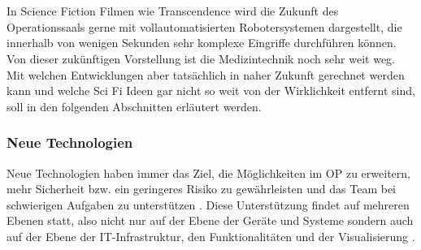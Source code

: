 \chapter{}
\label{sec:overview}

In Science Fiction Filmen wie Transcendence wird die Zukunft des Operationssaals gerne mit vollautomatisierten Robotersystemen dargestellt, die innerhalb von wenigen Sekunden sehr komplexe Eingriffe durchführen können. 
Von dieser zukünftigen Vorstellung ist die Medizintechnik noch sehr weit weg. Mit welchen Entwicklungen aber tatsächlich in naher Zukunft gerechnet werden kann und welche Sci Fi Ideen gar nicht so weit von der Wirklichkeit entfernt sind, soll in den folgenden Abschnitten erläutert werden.


\subsection{Neue Technologien}
Neue Technologien haben immer das Ziel, die Möglichkeiten im OP zu erweitern, mehr Sicherheit bzw. ein geringeres Risiko zu gewährleisten und das Team bei schwierigen Aufgaben zu unterstützen \cite{CurrentAndFuture}. Diese Unterstützung findet auf mehreren Ebenen statt, also nicht nur auf der Ebene der Geräte und Systeme sondern auch auf der Ebene der IT-Infrastruktur, den Funktionalitäten und der Visualisierung \cite{DerDigitaleOperationssaal}.


